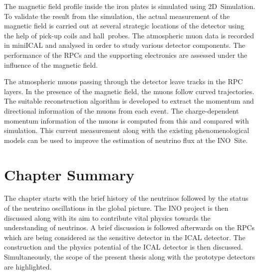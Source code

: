 The magnetic field profile inside the iron plates is simulated using
2D~Simulation. To validate the result from the simulation, the actual
measurement of the magnetic field is carried out at several strategic
locations of the detector using the help of pick-up coils and
hall~probes. The atmospheric muon data is recorded in miniICAL and
analysed in order to study various detector components. The
performance of the RPCs and the supporting electronics are assessed
under the influence of the magnetic field.

The atmospheric muons passing through the detector leave tracks in the
RPC layers. In the presence of the magnetic field, the muons follow
curved trajectories. The suitable reconstruction algorithm is
developed to extract the momentum and directional information of the
muons from each event. The charge-dependent momentum information of
the muons is computed from this and compared with simulation. This
current measurement along with the existing phenomenological models
can be used
to improve the estimation of neutrino flux at the INO~Site.

\section{Chapter Summary}
The chapter starts with the brief history of the neutrinos followed
by the status of the neutrino oscillations in the global picture. The
INO project is then discussed along with its aim to contribute vital
physics towards the understanding of neutrinos. A brief discussion is
followed afterwards on the RPCs which are being considered as the
sensitive detector in the ICAL detector. The construction and the physics
potential of the ICAL detector is then discussed. Simultaneously, the
scope of the present thesis along with the prototype detectors are
highlighted.
